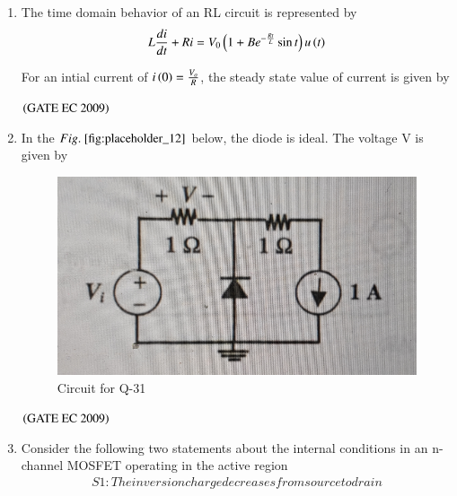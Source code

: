 \documentclass[journal,12pt,onecolumn]{IEEEtran}
\theoremstyle{remark}
\begin{document}
\begin{enumerate}[start=1, label={Q\arabic*.}]
\item The time domain behavior of an RL circuit is represented by 
\begin{align*} 
 L\frac{di}{dt} + Ri = V_0 \left(1+ Be^{-\frac{Rt}{L}} \sin t \right) u\left(t\right)
\end{align*}

For an intial current of $i\left(0\right) = \frac{V_o}{R}$, the steady state value of current is given by 
\begin{enumerate}
\end{enumerate}
\hfill $\left(\text{GATE EC 2009}\right)$

\item In the $\figref{fig:placeholder_12}$ below, the diode is ideal. The voltage V is given by
\begin{figure}[H]
    \centering
    \includegraphics[width=0.5\columnwidth]{figs/fig_12.jpg}
    \caption{\centering Circuit for Q-31}
    \label{fig:placeholder_12}
\end{figure}
\begin{enumerate}
\end{enumerate}
\hfill $\left(\text{GATE EC 2009}\right)$

\item Consider the following two statements about the internal conditions in an n-channel MOSFET operating in the active region 
\begin{align*}
    S1: The inversion charge decreases from source to drain
    

\end{align*}
\end{enumerate}
\end{document}
